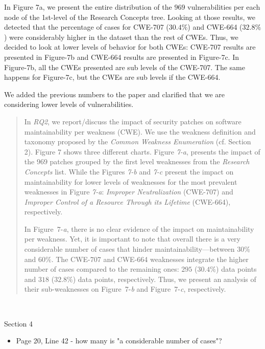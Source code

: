 \documentclass[11pt,fleqn]{article}
\newcommand{\eline}{\vspace*{.75\baselineskip}}
\newcommand{\Referee}[1]{\eline \noindent {\bf Reviewer comment #1:} \\}
\newenvironment{revcomment}[1][]
{\Referee{#1}\begin{rcomment}}
{\end{rcomment}}
\begin{document}
In Figure 7a, we present the entire distribution of the $969$ vulnerabilities per
each node of the 1st-level of the Research Concepts tree.
Looking at those results, we detected that the percentage of cases for CWE-707 ($30.4\%$) 
and CWE-664 ($32.8\%$) were considerably higher in the dataset than the rest of CWEs.
Thus, we decided to look at lower levels of behavior for both CWEs: CWE-707
results are presented in Figure-7b and CWE-664 results are presented in Figure-7c.
In Figure-7b, all the CWEs presented are sub levels of the CWE-707. The same
happens for Figure-7c, but the CWEs are sub levels if the CWE-664.

We added the previous numbers to the paper and clarified that we are considering lower levels
of vulnerabilities.

\begin{quote}
    In \emph{RQ2}, we report/discuss the impact of security patches on
    software maintainability per weakness (CWE). We use the weakness definition
    and taxonomy proposed by the \emph{Common Weakness Enumeration} (cf. Section 2).
    Figure 7 shows three different charts. Figure \emph{7-a}, presents
    the impact of the $969$ patches grouped by the first level weaknesses from
    the \emph{Research Concepts} list. While the Figures \emph{7-b} and
    \emph{7-c} present the impact on maintainability for lower levels of 
    weaknesses for the most prevalent weaknesses in Figure \emph{7-a}:
    \emph{Improper Neutralization} (CWE-707) 
    and \emph{Improper Control of a Resource 
    Through its Lifetime} (CWE-664), respectively.
    
    In Figure~7-\emph{a}, there is no clear evidence of the impact on 
    maintainability per weakness. Yet, it is important to note that
    overall there is a very considerable number of cases that hinder
    maintainability---between $30\%$ and $60\%$. The CWE-707 and CWE-664 
    weaknesses integrate the higher number of cases compared to the remaining 
    ones: $295$ ($30.4\%$) data points and $318$ ($32.8\%$) data points, respectively. 
    Thus, we present an analysis of their sub-weaknesses on 
    Figure~7-\emph{b} and Figure~7-\emph{c}, respectively. 
\end{quote}

\begin{revcomment}[2.19]
    Section 4\\
    \begin{itemize}
        \item Page 20, Line 42 - how many is "a considerable number of cases"?  
    \end{itemize}
\end{revcomment}
\end{document}
